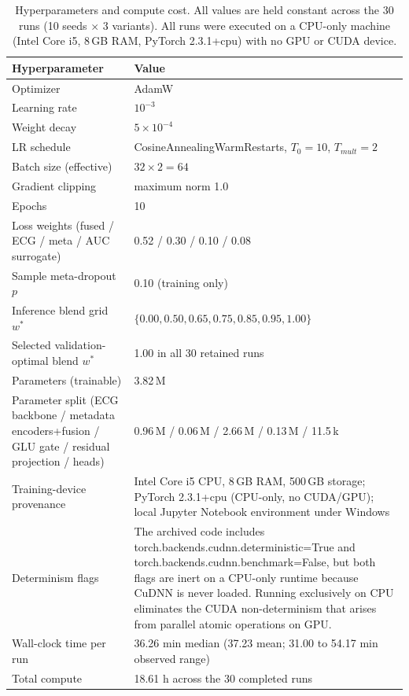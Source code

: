 \documentclass[mathematics,article,submit,pdftex]{Definitions/mdpi}
\def\texttt#1{#1}%
\def\mathrm#1{#1}%
\begin{document}
\begin{table}[H]
\caption{Hyperparameters and compute cost. All values are held constant across the 30 runs (10 seeds $\times$ 3 variants). All runs were executed on a CPU-only machine (Intel Core i5, 8\,GB RAM, PyTorch 2.3.1+cpu) with no GPU or CUDA device.}
\label{tab:hparams}
\centering
\small
\begin{tabularx}{\textwidth}{@{}>{\raggedright\arraybackslash}p{}X@{}}
\toprule
\textbf{Hyperparameter} & \textbf{Value} \\
\midrule
Optimizer              & AdamW \\
Learning rate          & $10^{-3}$ \\
Weight decay           & $5\times 10^{-4}$ \\
LR schedule            & CosineAnnealingWarmRestarts, $T_0{=}10$, $T_{\mathrm{mult}}{=}2$ \\
Batch size (effective) & $32\times 2 = 64$ \\
Gradient clipping      & maximum norm 1.0 \\
Epochs                 & 10 \\
Loss weights (fused / ECG / meta / AUC surrogate) & 0.52 / 0.30 / 0.10 / 0.08 \\
Sample meta-dropout $p$ & 0.10 (training only) \\
Inference blend grid $w^{\ast}$ & $\{0.00, 0.50, 0.65, 0.75, 0.85, 0.95, 1.00\}$ \\
Selected validation-optimal blend $w^{\ast}$ & 1.00 in all 30 retained runs \\
Parameters (trainable) & 3.82\,M \\
Parameter split (ECG backbone / metadata encoders+fusion / GLU gate / residual projection / heads) & 0.96\,M / 0.06\,M / 2.66\,M / 0.13\,M / 11.5\,k \\
Training-device provenance & Intel Core i5 CPU, 8\,GB RAM, 500\,GB storage; PyTorch 2.3.1+cpu (CPU-only, no CUDA/GPU); local Jupyter Notebook environment under Windows \\
Determinism flags & The archived code includes \texttt{torch.backends.cudnn.deterministic=True} and \texttt{torch.backends.cudnn.benchmark=False}, but both flags are inert on a CPU-only runtime because CuDNN is never loaded. Running exclusively on CPU eliminates the CUDA non-determinism that arises from parallel atomic operations on GPU. \\
Wall-clock time per run & 36.26 min median (37.23 mean; 31.00 to 54.17 min observed range) \\
Total compute          & 18.61 h across the 30 completed runs \\
\bottomrule
\end{tabularx}
\end{table}
\end{document}

